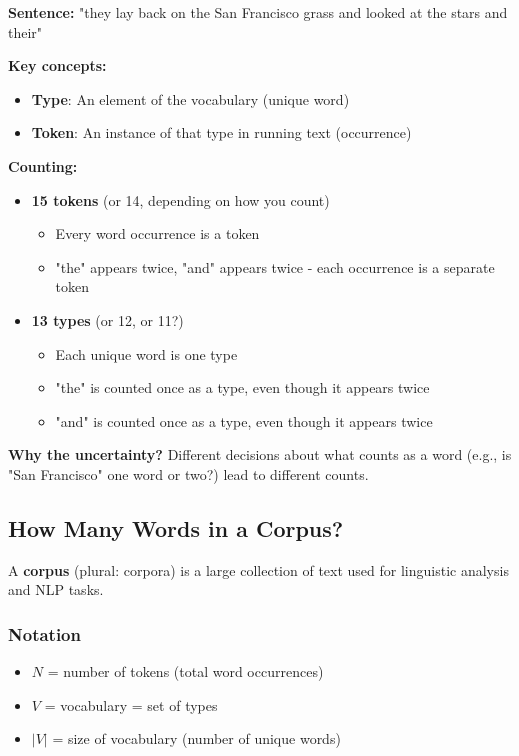 \documentclass[11pt,a4paper]{article}
\theoremstyle{definition}
\theoremstyle{plain}
\theoremstyle{remark}
\begin{document}
\textbf{Sentence:} "they lay back on the San Francisco grass and looked at the stars and their"

\textbf{Key concepts:}

\begin{itemize}
    \item \textbf{Type}: An element of the vocabulary (unique word)
    \item \textbf{Token}: An instance of that type in running text (occurrence)
\end{itemize}

\textbf{Counting:}
\begin{itemize}
    \item \textbf{15 tokens} (or 14, depending on how you count)
    \begin{itemize}
        \item Every word occurrence is a token
        \item "the" appears twice, "and" appears twice - each occurrence is a separate token
    \end{itemize}
    
    \item \textbf{13 types} (or 12, or 11?)
    \begin{itemize}
        \item Each unique word is one type
        \item "the" is counted once as a type, even though it appears twice
        \item "and" is counted once as a type, even though it appears twice
    \end{itemize}
\end{itemize}

\textbf{Why the uncertainty?} Different decisions about what counts as a word (e.g., is "San Francisco" one word or two?) lead to different counts.

\subsection{How Many Words in a Corpus?}

A \textbf{corpus} (plural: corpora) is a large collection of text used for linguistic analysis and NLP tasks.

\subsubsection{Notation}

\begin{itemize}
    \item \textbf{$N$} = number of tokens (total word occurrences)
    \item \textbf{$V$} = vocabulary = set of types
    \item \textbf{$|V|$} = size of vocabulary (number of unique words)
\end{itemize}
\end{document}

